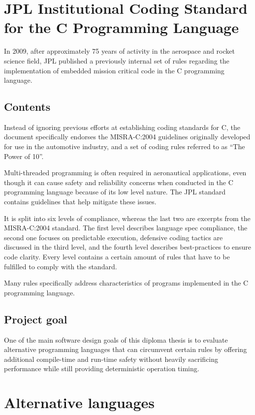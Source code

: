 \section{JPL Institutional Coding Standard for the C Programming Language}
\author{Philip Trauner}

In 2009, after approximately 75 years of activity in the aerospace and rocket science field, JPL published a previously internal set of rules regarding the implementation of embedded mission critical code in the C programming language. 

\subsection{Contents}
Instead of ignoring previous efforts at establishing coding standards for C, the document specifically endorses the MISRA-C:2004 guidelines originally developed for use in the automotive industry, and a set of coding rules referred to as “The Power of 10”. 

Multi-threaded programming is often required in aeronautical applications, even though it can cause safety and reliability concerns when conducted in the C programming language because of its low level nature. The JPL standard contains guidelines that help mitigate these issues.

It is split into six levels of compliance, whereas the last two are excerpts from the MISRA-C:2004 standard. The first level describes language spec compliance, the second one focuses on predictable execution, defensive coding tactics are discussed in the third level, and the fourth level describes best-practices to ensure code clarity. Every level contains a certain amount of rules that have to be fulfilled to comply with the standard.

Many rules specifically address characteristics of programs implemented in the C programming language.

\subsection{Project goal}
One of the main software design goals of this diploma thesis is to evaluate alternative programming languages that can circumvent certain rules by offering additional compile-time and run-time safety without heavily sacrificing performance while still providing deterministic operation timing.

\section{Alternative languages}
